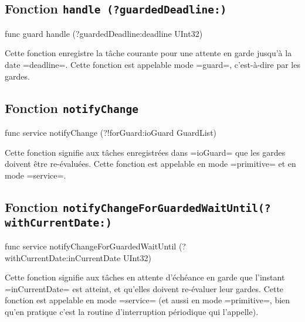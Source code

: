\subsection{Fonction \texttt{handle (?guardedDeadline{}:)}}

\begin{OMNIBUS}
func guard handle (?guardedDeadline:deadline UInt32)
\end{OMNIBUS}

Cette fonction enregistre la tâche courante pour une attente en garde jusqu'à la date \omnibus=deadline=. Cette fonction est appelable mode \omnibus=guard=, c'est-à-dire par les gardes.










\subsection{Fonction \texttt{notifyChange}}

\begin{OMNIBUS}
func service notifyChange (?!forGuard:ioGuard GuardList)
\end{OMNIBUS}

Cette fonction signifie aux tâches enregistrées dans \omnibus=ioGuard= que les gardes doivent être re-évaluées. Cette fonction est appelable en mode \omnibus=primitive= et en mode \omnibus=service=.











\subsection{Fonction \texttt{notifyChangeForGuardedWaitUntil(?withCurrentDate{}:)}}

\begin{OMNIBUS}
func service
notifyChangeForGuardedWaitUntil (?withCurrentDate:inCurrentDate UInt32)
\end{OMNIBUS}

Cette fonction signifie aux tâches en attente d'échéance en garde que l'instant \omnibus=inCurrentDate= est atteint, et qu'elles doivent re-évaluer leur gardes. Cette fonction est appelable en mode \omnibus=service= (et aussi en mode \omnibus=primitive=, bien qu'en pratique c'est la routine d'interruption périodique qui l'appelle).



